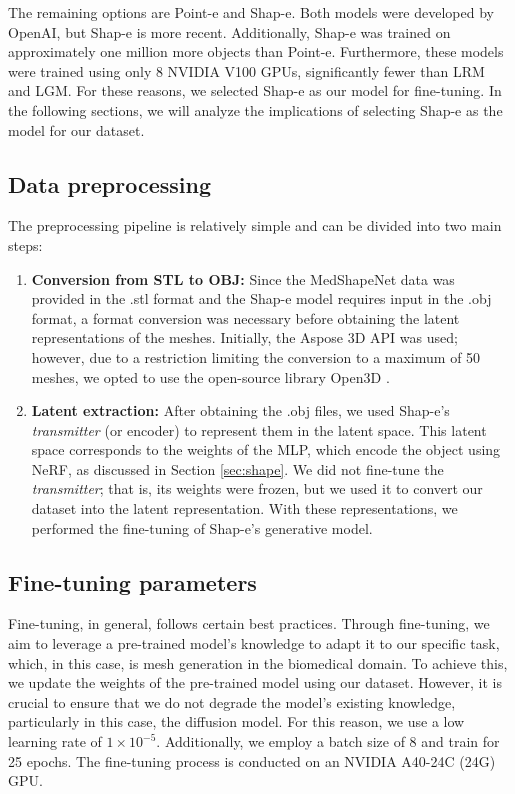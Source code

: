 \documentclass[journal]{IEEEtran}
\begin{document}
The remaining options are Point-e and Shap-e. Both models were developed by OpenAI, but Shap-e is more recent. Additionally, Shap-e was trained on approximately one million more objects than Point-e. Furthermore, these models were trained using only 8 NVIDIA V100 GPUs, significantly fewer than LRM and LGM. For these reasons, we selected Shap-e as our model for fine-tuning. In the following sections, we will analyze the implications of selecting Shap-e as the model for our dataset.

\subsection{Data preprocessing}

The preprocessing pipeline is relatively simple and can be divided into two main steps: 
\begin{enumerate}
    \item \textbf{Conversion from STL to OBJ:}
    Since the MedShapeNet data was provided in the .stl format and the Shap-e model requires input in the .obj format, a format conversion was necessary before obtaining the latent representations of the meshes. Initially, the Aspose 3D API \cite{Apose} was used; however, due to a restriction limiting the conversion to a maximum of 50 meshes, we opted to use the open-source library Open3D \cite{open3d}.
    
    \item \textbf{Latent extraction:}  
    After obtaining the .obj files, we used Shap-e’s \textit{transmitter} (or encoder) to represent them in the latent space. This latent space corresponds to the weights of the MLP, which encode the object using NeRF, as discussed in Section \ref{sec:shape}. We did not fine-tune the \textit{transmitter}; that is, its weights were frozen, but we used it to convert our dataset into the latent representation. With these representations, we performed the fine-tuning of Shap-e's generative model.  
\end{enumerate}

\subsection{Fine-tuning parameters}

Fine-tuning, in general, follows certain best practices. Through fine-tuning, we aim to leverage a pre-trained model's knowledge to adapt it to our specific task, which, in this case, is mesh generation in the biomedical domain. To achieve this, we update the weights of the pre-trained model using our dataset. However, it is crucial to ensure that we do not degrade the model's existing knowledge, particularly in this case, the diffusion model. For this reason, we use a low learning rate of \(1 \times 10^{-5}\). Additionally, we employ a batch size of 8 and train for 25 epochs. The fine-tuning process is conducted on an NVIDIA A40-24C (24G) GPU.
\end{document}
